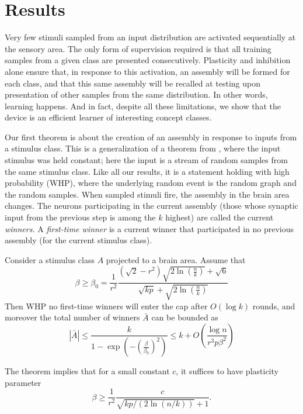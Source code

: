 \documentclass[final,12pt]{colt2022} %
\newcommand{\support}[1]{\bar{#1}}
\begin{document}
\section{Results} \label{results}
Very few stimuli sampled from an input distribution are activated sequentially at the sensory area.   %
The only form of supervision required is that all training samples from a given class are presented consecutively. %
Plasticity and inhibition alone ensure that, in response to this activation, an assembly will be formed for each class, and that this same assembly will be recalled at testing upon presentation of other samples from the same distribution. In other words, learning happens. 
And in fact, despite all these limitations, we show that the device is an efficient learner of interesting concept classes.

Our first theorem is about the creation of an assembly in response to inputs from a stimulus class. This is a generalization of a theorem from \citet{papadimitriou2019random}, where the input stimulus was held constant; here the input is a stream of random samples from the same stimulus class. Like all our results, it is a statement holding with high probability (WHP), where the underlying random event is the random graph and the random samples. When sampled stimuli fire, the assembly in the brain area changes. The neurons participating in the current assembly (those whose synaptic input from the previous step is among the $k$ highest) are called the current {\em winners.}
A {\em first-time winner} is a current winner that participated in no previous assembly (for the current stimulus class).

\begin{theorem}[Creation] \label{theorem:creation} 
Consider a stimulus class $A$ projected to a brain area. Assume that 
\[\beta \geq \beta_0 = \frac{1}{r^2}\frac{\left(\sqrt{2} - r^2\right)\sqrt{2\ln\left(\frac{n}{k}\right)} + \sqrt{6}}{\sqrt{kp} + \sqrt{2\ln\left(\frac{n}{k}\right)}}\] Then WHP no first-time winners will enter the cap after $O(\log k)$ rounds, and moreover the total number of winners $\support{A}$  can be bounded as \[|\support{A}| \leq \frac{k}{1-\exp(-(\frac{\beta}{\beta_0})^2)} \leq k + O\left(\frac{\log n}{r^3p\beta^2}\right)\]  \end{theorem}
\begin{remark}
The theorem implies that for a small constant $c$, it suffices to have plasticity parameter 
\[
\beta \ge \frac{1}{r^2}\frac{c}{\sqrt{kp/(2\ln(n/k))}+1}.
\]
\end{remark}
\end{document}
